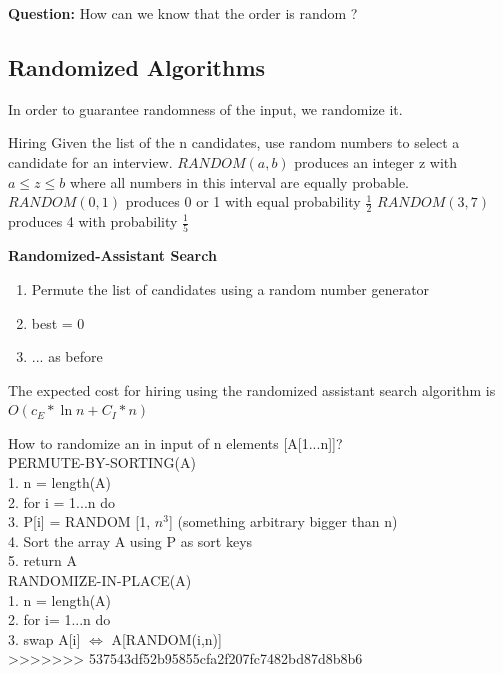 \textbf{Question:}
How can we know that the order is random ?\\

\subsection{Randomized Algorithms}
In order to guarantee randomness of the input, we randomize it. 

\begin{example}{Hiring}
Given the list of the n candidates, use random numbers to select a candidate for an interview.
$RANDOM(a,b)$ produces an integer z with  $a \leq z \leq b$ where all numbers in this interval are equally probable. 
$RANDOM(0,1)$ produces 0 or 1 with equal probability $\frac{1}{2}$
$RANDOM(3,7)$ produces 4 with probability $\frac{1}{5}$ \\
\end{example}
  
\textbf{Randomized-Assistant Search}
\begin{enumerate}[label={\arabic*.}]
 \item Permute the list of candidates using a  random number generator
 \item best = 0
 \item ... as before
\end{enumerate}

\begin{lemma}
The expected cost for hiring using the randomized assistant search algorithm is \\
$O( c_E * \ln n + C_I * n)$
\end{lemma}
How to randomize an in input of n elements [A[1...n]]? \\
PERMUTE-BY-SORTING(A) \\
1.	n = length(A) \\
2.	for i = 1...n do \\
3.	P[i] = RANDOM [1, $n^3$] (something arbitrary bigger than n) \\
4.	Sort the array A using P as sort keys \\
5.	return A \\
\newline
RANDOMIZE-IN-PLACE(A) \\
1.	n = length(A) \\
2.	for i= 1...n do \\
3.	  swap A[i] $\Leftrightarrow$  A[RANDOM(i,n)] \\
>>>>>>> 537543df52b95855cfa2f207fc7482bd87d8b8b6

